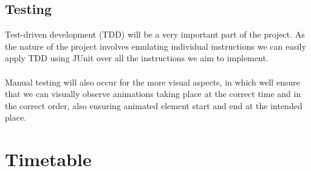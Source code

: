 \documentclass[a4paper,fleqn,12pt]{article}
\begin{document}
\subsection{Testing}
Test-driven development (TDD) will be a very important part of the project. As the nature of the project involves emulating individual instructions we can easily apply TDD using JUnit \cite{junitteam_2019_junit} over all the instructions we aim to implement.
\\\\
Manual testing will also occur for the more visual aspects, in which well ensure that we can visually observe animations taking place at the correct time and in the correct order, also ensuring animated element start and end at the intended place.


\section{Timetable}
\end{document}
